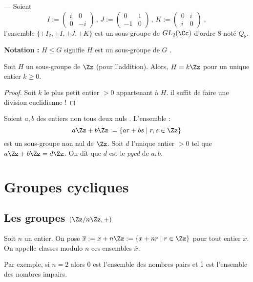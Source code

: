 \documentclass[class=report,crop=false]{standalone}
\newcommand{\GL}{GL}
\begin{document}
--- Soient \[I:=\left(\begin{array}{cc}
i & 0\\
0 & -i
\end{array}\right)\,,\, J:=\left(\begin{array}{cc}
0 & 1\\
-1 & 0
\end{array}\right)\,,\, K:=\left(\begin{array}{cc}
0 & i\\
i & 0
\end{array}\right) \;,\] l'ensemble $\{\pm I_2,\pm I,\pm J,\pm K\}$ est un sous-groupe de $\GL_2(\Cc)$ d'ordre $8$ noté $Q_8$.

{\bf Notation :} $H \le G$ signifie \og $H$ est un sous-groupe de $G$ \fg . 


\begin{proposition}
Soit $H$ un sous-groupe de $\Zz$ (pour l'addition). Alors, $H=k\Zz$ pour un unique entier $k \ge 0$.
\end{proposition}

\begin{proof}
Soit $k$ le plus petit entier $>0$ appartenant à $H$. il suffit de faire une division euclidienne !
\end{proof}

Soient $a,b$ des entiers non tous deux nuls . L'ensemble :
\[a \Zz + b \Zz :=\left\{ar+bs \mid r,s \in \Zz \right\}\]
est un sous-groupe non nul de $\Zz$. Soit $d$ l'unique entier $> 0$ tel que $a\Zz+b\Zz = d\Zz$. On dit que $d$ est le {\it pgcd} de $a,b$.

\section{Groupes cycliques}

\subsection{Les groupes $\mathbf( \Zz/n\Zz,+)$}


Soit $n$ un entier. On pose $\overline{x}:= x+n\Zz := \left\{x+nr \mid r \in \Zz \right\}$ pour tout entier $x$. On appelle classes modulo $n$ ces ensembles $\overline{x}$.

Par exemple, si $n=2$ alors $\overline{0}$ est l'ensemble des nombres pairs et $\overline{1}$ est l'ensemble des nombres impairs.
\end{document}

